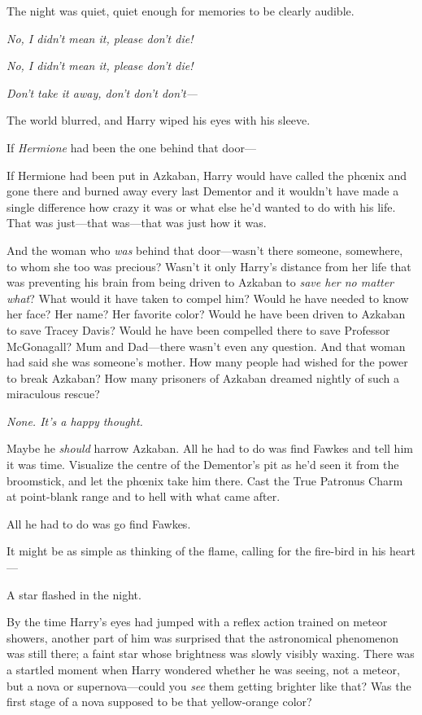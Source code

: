 The night was quiet, quiet enough for memories to be clearly audible.

\emph{No, I didn't mean it, please don't die!}

\emph{No, I didn't mean it, please don't die!}

\emph{Don't take it away, don't don't don't---}

The world blurred, and Harry wiped his eyes with his sleeve.

If \emph{Hermione} had been the one behind that door---

If Hermione had been put in Azkaban, Harry would have called the phœnix and gone there and burned away every last Dementor and it wouldn't have made a single difference how crazy it was or what else he'd wanted to do with his life. That was just---that was---that was just how it was.

And the woman who \emph{was} behind that door---wasn't there someone, somewhere, to whom she too was precious? Wasn't it only Harry's distance from her life that was preventing his brain from being driven to Azkaban to \emph{save her no matter what}? What would it have taken to compel him? Would he have needed to know her face? Her name? Her favorite color? Would he have been driven to Azkaban to save Tracey Davis? Would he have been compelled there to save Professor McGonagall? Mum and Dad---there wasn't even any question. And that woman had said she was someone's mother. How many people had wished for the power to break Azkaban? How many prisoners of Azkaban dreamed nightly of such a miraculous rescue?

\emph{None. It's a happy thought.}

Maybe he \emph{should} harrow Azkaban. All he had to do was find Fawkes and tell him it was time. Visualize the centre of the Dementor's pit as he'd seen it from the broomstick, and let the phœnix take him there. Cast the True Patronus Charm at point-blank range and to hell with what came after.

All he had to do was go find Fawkes.

It might be as simple as thinking of the flame, calling for the fire-bird in his heart---

A star flashed in the night.

By the time Harry's eyes had jumped with a reflex action trained on meteor showers, another part of him was surprised that the astronomical phenomenon was still there; a faint star whose brightness was slowly visibly waxing. There was a startled moment when Harry wondered whether he was seeing, not a meteor, but a nova or supernova---could you \emph{see} them getting brighter like that? Was the first stage of a nova supposed to be that yellow-orange color?

